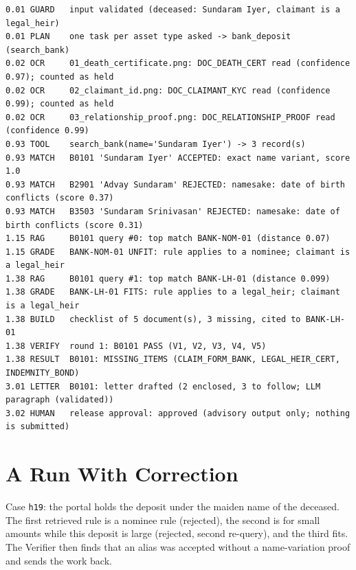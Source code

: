 \documentclass[12pt,a4paper,oneside]{report}
\begin{document}
\begin{lstlisting}[numbers=none,basicstyle=\ttfamily\tiny\setstretch{1.0},caption={Trace of a successful run (case e01), condensed.},label={lst:e01}]
0.01 GUARD   input validated (deceased: Sundaram Iyer, claimant is a legal_heir)
0.01 PLAN    one task per asset type asked -> bank_deposit (search_bank)
0.02 OCR     01_death_certificate.png: DOC_DEATH_CERT read (confidence 0.97); counted as held
0.02 OCR     02_claimant_id.png: DOC_CLAIMANT_KYC read (confidence 0.99); counted as held
0.02 OCR     03_relationship_proof.png: DOC_RELATIONSHIP_PROOF read (confidence 0.99)
0.93 TOOL    search_bank(name='Sundaram Iyer') -> 3 record(s)
0.93 MATCH   B0101 'Sundaram Iyer' ACCEPTED: exact name variant, score 1.0
0.93 MATCH   B2901 'Advay Sundaram' REJECTED: namesake: date of birth conflicts (score 0.37)
0.93 MATCH   B3503 'Sundaram Srinivasan' REJECTED: namesake: date of birth conflicts (score 0.31)
1.15 RAG     B0101 query #0: top match BANK-NOM-01 (distance 0.07)
1.15 GRADE   BANK-NOM-01 UNFIT: rule applies to a nominee; claimant is a legal_heir
1.38 RAG     B0101 query #1: top match BANK-LH-01 (distance 0.099)
1.38 GRADE   BANK-LH-01 FITS: rule applies to a legal_heir; claimant is a legal_heir
1.38 BUILD   checklist of 5 document(s), 3 missing, cited to BANK-LH-01
1.38 VERIFY  round 1: B0101 PASS (V1, V2, V3, V4, V5)
1.38 RESULT  B0101: MISSING_ITEMS (CLAIM_FORM_BANK, LEGAL_HEIR_CERT, INDEMNITY_BOND)
3.01 LETTER  B0101: letter drafted (2 enclosed, 3 to follow; LLM paragraph (validated))
3.02 HUMAN   release approval: approved (advisory output only; nothing is submitted)
\end{lstlisting}

\section{A Run With Correction}
Case \texttt{h19}: the portal holds the deposit under the maiden name of the deceased. The first retrieved rule is a nominee rule (rejected), the second is for small amounts while this deposit is large (rejected, second re-query), and the third fits. The Verifier then finds that an alias was accepted without a name-variation proof and sends the work back.
\end{document}
